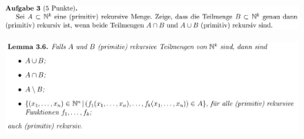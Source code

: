 \documentclass[a4paper]{scrartcl}%
\begin{document}
\section*{}%
\label{sec:aufgabe_3}

    \begin{figure}[H]
        \includegraphics[scale=0.3]{./A-3.png}
        \label{fig:}
    \end{figure}

    \begin{figure}[H]
        \centering
        \includegraphics[scale=0.3]{./prim-rek.png}
        \label{fig:./prim-rek}
    \end{figure}
\end{document}
